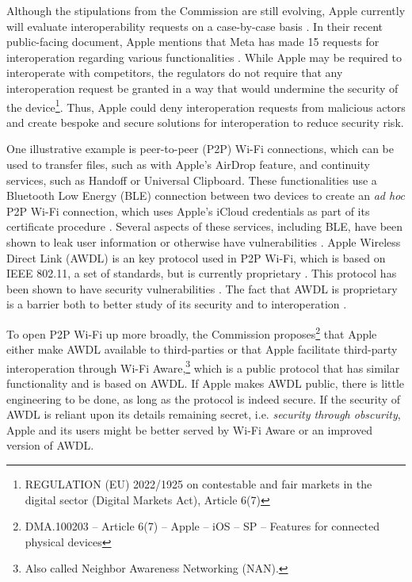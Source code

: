 \documentclass[letterpaper,twocolumn,10pt]{article}
\begin{document}
Although the stipulations from the Commission are still evolving, Apple currently will evaluate interoperability requests on a case-by-case basis \cite{apple_white_paper_2}.  In their recent public-facing document, Apple mentions that Meta has made 15 requests for interoperation regarding various functionalities \cite{apple_white_paper_2}. While Apple may be required to interoperate with competitors, the regulators do not require that any interoperation request be granted in a way that would undermine the security of the device\footnote{REGULATION (EU) 2022/1925 on contestable and fair markets in the digital sector (Digital Markets Act), Article 6(7) }. Thus, Apple could deny interoperation requests from malicious actors and create bespoke and secure solutions for interoperation to reduce security risk.

One illustrative example is peer-to-peer (P2P) Wi-Fi connections, which can be used to transfer files, such as with Apple's AirDrop feature, and continuity services, such as Handoff or Universal Clipboard\cite{Darmstadt_21}. These functionalities use a Bluetooth Low Energy (BLE) connection between two devices to create an \emph{ad hoc} P2P Wi-Fi connection, which uses Apple's iCloud credentials as part of its certificate procedure \cite{apple_security}. Several aspects of these services, including BLE, have been shown to leak user information or otherwise have vulnerabilities \cite{BLE_not_private, ble_not_private_2, apple_bluetooth}.  Apple Wireless Direct Link (AWDL) is an key protocol used in P2P Wi-Fi, which is based on IEEE 802.11, a set of standards, but is currently proprietary \cite{Darmstadt_18}.  This protocol has been shown to have security vulnerabilities \cite{Darmstadt_18, Darmstadt_19, Darmstadt_21}. The fact that AWDL is proprietary is a barrier both to better study of its security and to interoperation \cite{Darmstadt_18}. 

To open P2P Wi-Fi up more broadly, the Commission proposes\footnote{DMA.100203 – Article 6(7) – Apple – iOS – SP – Features for connected physical devices} that Apple either make AWDL available to third-parties or that Apple facilitate third-party interoperation through Wi-Fi Aware,\footnote{Also called Neighbor Awareness Networking (NAN).} which is a public protocol that has similar functionality and is based on AWDL\cite{wifi_patent}. If Apple makes AWDL public, there is little engineering to be done, as long as the protocol is indeed secure.  If the security of AWDL is reliant upon its details remaining secret, i.e. \emph{security through obscurity}, Apple and its users might be better served by Wi-Fi Aware or an improved version of AWDL. 
\end{document}
